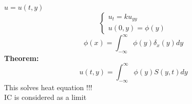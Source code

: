 \documentclass{article}
\begin{document}
$u = u(t,y)$\\
$$\begin{cases}
    u_t = k u_{yy}\\
    u(0,y) = \phi(y)
\end{cases}
$$
$$ \phi(x) = \int_{-\infty}^{\infty} \phi(y) \delta_x(y) dy$$
\textbf{Theorem:} \\
$$u(t,y) = \int_{-\infty}^{\infty} \phi(y) S(y,t) dy$$
This solves heat equation !!!\\
IC is considered as a limit 



\end{document}
